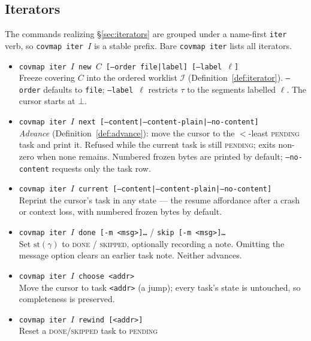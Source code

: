 \documentclass[11pt,a4paper]{article}
\begin{document}
\subsection{Iterators}\label{sec:iter-interface}

The commands realizing \S\ref{sec:iterators} are grouped under a
name-first \texttt{iter} verb, so \texttt{covmap iter $I$} is a stable
prefix. Bare \texttt{covmap iter} lists all iterators.

\begin{itemize}[leftmargin=2em,itemsep=2pt]
\item \texttt{covmap iter $I$ new $C$ [--order file|label] [--label $\ell$]}\\
      Freeze covering $C$ into the ordered worklist $\mathcal{I}$
      (Definition~\ref{def:iterator}). \texttt{--order} defaults to
      \texttt{file}; \texttt{--label $\ell$} restricts $\tau$ to the
      segments labelled $\ell$. The cursor starts at $\bot$.
\item \texttt{covmap iter $I$ next [--content|--content-plain|--no-content]}\\
      \emph{Advance} (Definition~\ref{def:advance}): move the cursor to
      the $<$-least \textsc{pending} task and print it. Refused while the
      current task is still \textsc{pending}; exits non-zero when none
      remains. Numbered frozen bytes are printed by default;
      \texttt{--no-content} requests only the task row.
\item \texttt{covmap iter $I$ current [--content|--content-plain|--no-content]}\\
      Reprint the cursor's task in any state --- the resume affordance
      after a crash or context loss, with numbered frozen bytes by default.
\item \texttt{covmap iter $I$ done [-m <msg>]\ldots} /
      \texttt{skip [-m <msg>]\ldots}\\
      Set $\mathrm{st}(\gamma)$ to \textsc{done} / \textsc{skipped},
      optionally recording a note. Omitting the message option clears an
      earlier task note. Neither advances.
\item \texttt{covmap iter $I$ choose <addr>}\\
      Move the cursor to task \texttt{<addr>} (a jump); every task's state
      is untouched, so completeness is preserved.
\item \texttt{covmap iter $I$ rewind [<addr>]}\\
      Reset a \textsc{done}/\textsc{skipped} task to \textsc{pending}

\end{itemize}
\end{document}
